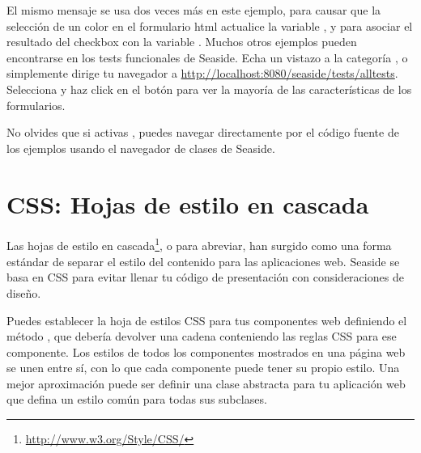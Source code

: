 \documentclass[a4paper,10pt,twoside]{book}
\begin{document}
El mismo mensaje se usa dos veces más en este ejemplo, para causar que la selección de un color en el formulario html actualice la variable , y para asociar el resultado del checkbox con la variable .
Muchos otros ejemplos pueden encontrarse en los tests funcionales de Seaside.
Echa un vistazo a la categoría , o simplemente dirige tu navegador a \url{http://localhost:8080/seaside/tests/alltests}.
Selecciona  y haz click en el botón  para ver la mayoría de las características de los formularios.

No olvides que si activas , puedes navegar directamente por el código fuente de los ejemplos usando el navegador de clases de Seaside.

\section{CSS: Hojas de estilo en cascada}


Las hojas de estilo en cascada\footnote{\url{http://www.w3.org/Style/CSS/}}, o  para abreviar, han surgido como una forma estándar de separar el estilo del contenido para las aplicaciones web.
Seaside se basa en CSS para evitar llenar tu código de presentación con consideraciones de diseño.

Puedes establecer la hoja de estilos CSS para tus componentes web definiendo el método , que debería devolver una cadena conteniendo las reglas CSS para ese componente.
Los estilos de todos los componentes mostrados en una página web se unen entre sí, con lo que cada componente puede tener su propio estilo.
Una mejor aproximación puede ser definir una clase abstracta para tu aplicación web que defina un estilo común para todas sus subclases.
\end{document}
